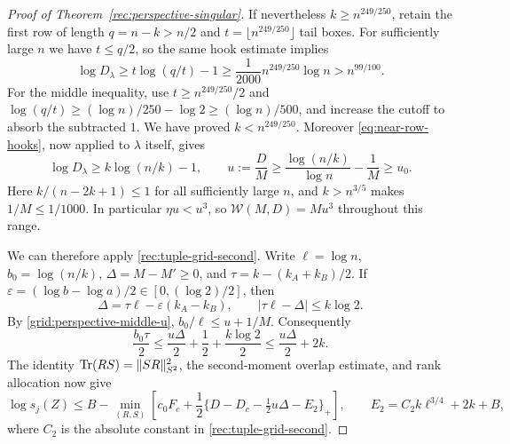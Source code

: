 \begin{proof}[Proof of Theorem~\ref{rec:perspective-singular}]
If nevertheless $k\ge n^{249/250}$, retain the first row of
length $q=n-k>n/2$ and $t=\lfloor n^{249/250}\rfloor$ tail
boxes.  For sufficiently large $n$ we have $t\le q/2$, so the
same hook estimate implies
\[
 \log D_\lambda\ge t\log(q/t)-1
 \ge\frac1{2000}n^{249/250}\log n
 >n^{99/100}.
\]
For the middle inequality, use $t\ge n^{249/250}/2$ and
$\log(q/t)\ge(\log n)/250-\log2\ge(\log n)/500$,
and increase the cutoff to absorb the subtracted $1$.
We have proved $k<n^{249/250}$.  Moreover
\eqref{eq:near-row-hooks}, now applied to $\lambda$ itself,
gives
\begin{equation}\label{grid:perspective-middle-u}
 \log D_\lambda\ge k\log(n/k)-1,
 \qquad
 u:=\frac{D}{M}\ge\frac{\log(n/k)}{\log n}-\frac1M
 \ge u_0.
\end{equation}
Here $k/(n-2k+1)\le1$ for all sufficiently large $n$, and
$k>n^{3/5}$ makes $1/M\le1/1000$.  In particular
$\eta u<u^3$, so $\mathcal W(M,D)=Mu^3$ throughout this range.

We can therefore apply \eqref{rec:tuple-grid-second}.  Write
$\ell=\log n$, $b_0=\log(n/k)$, $\Delta=M-M'\ge0$, and
$\tau=k-(k_A+k_B)/2$.  If
$\varepsilon=(\log b-\log a)/2\in[0,(\log2)/2]$, then
\[
 \Delta=\tau\ell-\varepsilon(k_A-k_B),\qquad
 |\tau\ell-\Delta|\le k\log2.
\]
By \eqref{grid:perspective-middle-u}, $b_0/\ell\le u+1/M$.
Consequently
\begin{equation}\label{grid:perspective-middle-mass-loss}
 \frac{b_0\tau}{2}
 \le\frac{u\Delta}{2}+\frac12+\frac{k\log2}{2}
 \le\frac{u\Delta}{2}+2k.
\end{equation}
The identity $\operatorname{Tr}(RS)=\|SR\|_{S^2}^2$, the second-moment
overlap estimate, and rank allocation now give
\begin{equation}\label{grid:perspective-middle-indexed}
 \log s_j(Z)\le B-\min_{(R,S)}\left[
 c_0F_c+\frac12\{D-D_c-\tfrac12u\Delta-E_2\}_+\right],
 \qquad E_2=C_2k\ell^{3/4}+2k+B,
\end{equation}
where $C_2$ is the absolute constant in
\eqref{rec:tuple-grid-second}.


\end{proof}
